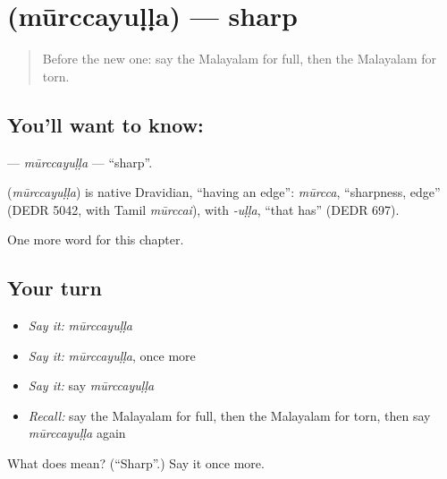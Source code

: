 \section[\texorpdfstring{\ml{മൂർച്ചയുള്ള} (mūrccayuḷḷa)}{മൂർച്ചയുള്ള (mūrccayuḷḷa)}]{ (mūrccayuḷḷa) — sharp}

\label{lesson:ML-C244-murccayulla}



\begin{quote}
Before the new one: say the Malayalam for full, then the Malayalam for torn.
\end{quote}

\subsection*{You'll want to know: }
\textbf{} — \emph{mūrccayuḷḷa} — \textquotedblleft{}sharp\textquotedblright{}.

\begin{cousinweb}
\textbf{} (\emph{mūrccayuḷḷa}) is native Dravidian, \textquotedblleft{}having an edge\textquotedblright{}: \emph{mūrcca}, \textquotedblleft{}sharpness, edge\textquotedblright{} (DEDR 5042, with Tamil \emph{mūrccai}), with \emph{-uḷḷa}, \textquotedblleft{}that has\textquotedblright{} (DEDR 697).
\end{cousinweb}

\begin{grammarlens}[title={What you've built}]
One more word for this chapter.
\end{grammarlens}

\subsection*{Your turn}
\begin{itemize}
\raggedright
  \item \emph{Say it:} \emph{mūrccayuḷḷa}
  \item \emph{Say it:} \emph{mūrccayuḷḷa}, once more
  \item \emph{Say it:} say \emph{mūrccayuḷḷa}
  \item \emph{Recall:} say the Malayalam for full, then the Malayalam for torn, then say \emph{mūrccayuḷḷa} again
\end{itemize}

\begin{tcolorbox}[breakable,colback=teal!4,colframe=teal!35!black,title={Before you move on}]
What does  mean? (\textquotedblleft{}Sharp\textquotedblright{}.) Say it once more.
\end{tcolorbox}
